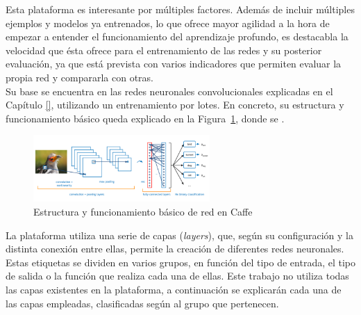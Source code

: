 Esta plataforma es interesante por múltiples factores. Además de incluir múltiples ejemplos y modelos ya entrenados, lo que ofrece mayor agilidad a la hora de empezar a entender el funcionamiento del aprendizaje profundo, es destacabla la velocidad que ésta ofrece para el entrenamiento de las redes y su posterior evaluación, ya que está prevista con varios indicadores que permiten evaluar la propia red y compararla con otras.\\ 

Su base se encuentra en las redes neuronales convolucionales explicadas en el Capítulo \ref{}, utilizando un entrenamiento por lotes. En concreto, su estructura y funcionamiento básico queda explicado en la Figura~\ref{fig.redCaffe}, donde se .\\

\begin{figure}[h!]
	\begin{center}
		\includegraphics[width=0.6\textwidth]{figures/red_caffe}
		\caption{Estructura y funcionamiento básico de red en Caffe}
		\label{fig.redCaffe}
	\end{center}
\end{figure}

La plataforma utiliza una serie de capas (\textit{layers}), que, según su configuración y la distinta conexión entre ellas, permite la creación de diferentes redes neuronales. Estas etiquetas se dividen en varios grupos, en función del tipo de entrada, el tipo de salida o la función que realiza cada una de ellas. Este trabajo no utiliza todas las capas existentes en la plataforma, a continuación se explicarán cada una de las capas empleadas, clasificadas según al grupo que pertenecen.\\
\vspace{-20pt}

